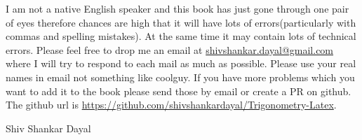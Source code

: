 I am not a native English speaker and this book has just gone through one pair
of eyes therefore chances are high that it will have lots of errors(particularly with commas and spelling mistakes). At the
same time it may contain lots of technical errors. Please feel free to drop me
an email at
\href{mailto:shivshankar.dayal@gmail.com}{shivshankar.dayal@gmail.com} where I
will try to respond to each mail as
much as possible. Please use your real names in email not something like
coolguy. If you have more problems which you want to add it to the book please send
those by email or create a PR on github. The github url is \url{https://github.com/shivshankardayal/Trigonometry-Latex}.
\begin{flushright}
Shiv Shankar Dayal
\end{flushright}
